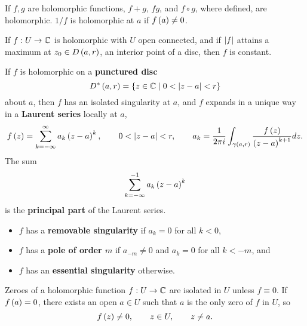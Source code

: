 \begin{remark}
If $ f, g $ are holomorphic functions, $ f + g $, $ fg $, and $ f \circ g $, where defined, are holomorphic. $ 1 / f $ is holomorphic at $ a $ if $ f\left( a \right) \ne 0 $.
\end{remark}

\begin{theorem}
If $ f : U \to \mathbb{C} $ is holomorphic with $ U $ open connected, and if $ \left\lvert f \right\rvert $ attains a maximum at $ z_0 \in D\left( a, r \right) $, an interior point of a disc, then $ f $ is constant.
\end{theorem}

\begin{remark}
If $ f $ is holomorphic on a \textbf{punctured disc}
$$ D^*\left( a, r \right) = \left\{ z \in \mathbb{C} \mid 0 < \left\lvert z - a \right\rvert < r \right\} $$
about $ a $, then $ f $ has an isolated singularity at $ a $, and $ f $ expands in a unique way in a \textbf{Laurent series} locally at $ a $,
$$ f\left( z \right) = \sum_{k = -\infty}^\infty a_k\left( z - a \right)^k, \qquad 0 < \left\lvert z - a \right\rvert < r, \qquad a_k = \dfrac{1}{2\pi i} \int_{\gamma\left( a, r \right)} \dfrac{f\left( z \right)}{\left( z - a \right)^{k + 1}} dz. $$
The sum
$$ \sum_{k = -\infty}^{-1} a_k\left( z - a \right)^k $$
is the \textbf{principal part} of the Laurent series.
\begin{itemize}
\item $ f $ has a \textbf{removable singularity} if $ a_k = 0 $ for all $ k < 0 $,
\item $ f $ has a \textbf{pole of order $ m $} if $ a_{-m} \ne 0 $ and $ a_k = 0 $ for all $ k < -m $, and
\item $ f $ has an \textbf{essential singularity} otherwise.
\end{itemize}
\end{remark}


\begin{theorem}
Zeroes of a holomorphic function $ f : U \to \mathbb{C} $ are isolated in $ U $ unless $ f \equiv 0 $. If $ f\left( a \right) = 0 $, there exists an open $ a \in U $ such that $ a $ is the only zero of $ f $ in $ U $, so
$$ f\left( z \right) \ne 0, \qquad z \in U, \qquad z \ne a. $$
\end{theorem}

